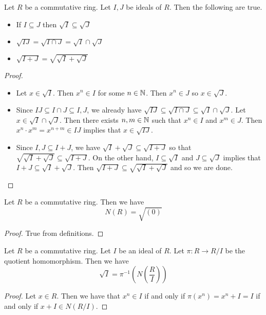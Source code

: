 \documentclass[a4paper]{article}
\begin{document}
\begin{prp}{}{} Let $R$ be a commutative ring. Let $I,J$ be ideals of $R$. Then the following are true. 
\begin{itemize}
\item If $I\subseteq J$ then $\sqrt{I}\subseteq\sqrt{J}$
\item $\sqrt{IJ}=\sqrt{I\cap J}=\sqrt{I}\cap\sqrt{J}$
\item $\sqrt{I+J}=\sqrt{\sqrt{I}+\sqrt{J}}$
\end{itemize} \tcbline
\begin{proof}~\\
\begin{itemize}
\item Let $x\in\sqrt{I}$. Then $x^n\in I$ for some $n\in\mathbb{N}$. Then $x^n\in J$ so $x\in\sqrt{J}$. 
\item Since $IJ\subseteq I\cap J\subseteq I,J$, we already have $\sqrt{IJ}\subseteq\sqrt{I\cap J}\subseteq\sqrt{I}\cap\sqrt{J}$. Let $x\in\sqrt{I}\cap\sqrt{J}$. Then there exists $n,m\in\mathbb{N}$ such that $x^n\in I$ and $x^m\in J$. Then $x^n\cdot x^m=x^{n+m}\in IJ$ implies that $x\in\sqrt{IJ}$. 
\item Since $I,J\subseteq I+J$, we have $\sqrt{I}+\sqrt{J}\subseteq\sqrt{I+J}$ so that $\sqrt{\sqrt{I}+\sqrt{J}}\subseteq\sqrt{I+J}$. On the other hand, $I\subseteq\sqrt{I}$ and $J\subseteq\sqrt{J}$ implies that $I+J\subseteq\sqrt{I}+\sqrt{J}$. Then $\sqrt{I+J}\subseteq\sqrt{\sqrt{I}+\sqrt{J}}$ and so we are done. 
\end{itemize}
\end{proof}
\end{prp}

\begin{lmm}{}{} Let $R$ be a commutative ring. Then we have $$N(R)=\sqrt{(0)}$$ \tcbline
\begin{proof}
True from definitions. 
\end{proof}
\end{lmm}

\begin{lmm}{}{} Let $R$ be a commutative ring. Let $I$ be an ideal of $R$. Let $\pi:R\to R/I$ be the quotient homomorphism. Then we have $$\sqrt{I}=\pi^{-1}\left(N\left(\frac{R}{I}\right)\right)$$ \tcbline
\begin{proof}
Let $x\in R$. Then we have that $x^n\in I$ if and only if $\pi(x^n)=x^n+I=I$ if and only if $x+I\in N(R/I)$. 
\end{proof}
\end{lmm}
\end{document}
